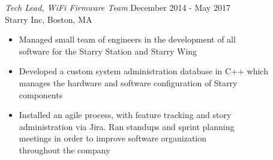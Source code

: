 \documentclass[line,margin]{res}
\begin{document}
\begin{resume}
            {\sl Tech Lead, WiFi Firmware Team} \hfill December 2014 - May 2017 \\
            Starry Inc, Boston, MA
                \begin{itemize} \itemsep -2pt %
                    \item Managed small team of engineers in the development of all \\
                          software for the Starry Station and Starry Wing %
                    \item Developed a custom system administration database in C++ which \\
                          manages the hardware and software configuration of Starry \\
                          components %
                    \item Installed an agile process, with feature tracking and story \\
                          administration via Jira. Ran standups and sprint planning \\
                          meetings in order to improve software organization \\
                          throughout the company %
                \end{itemize}


\end{resume}
\end{document}
